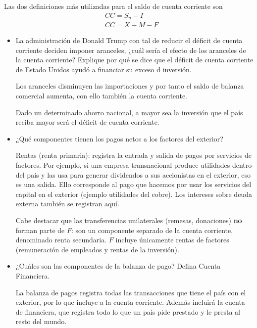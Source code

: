 \documentclass[a4paper]{article}
\begin{document}
        Las dos definiciones más utilizadas para el saldo de cuenta corriente son 
        \begin{align*}
            &CC = S_n -I \\
            &CC = X-M-F
        \end{align*}
        \begin{itemize}
        \item[f)] La administración de Donald Trump con tal de reducir el déficit de cuenta corriente deciden imponer aranceles, ¿cuál sería el efecto de los aranceles de la cuenta corriente? Explique por qué se dice que el déficit de cuenta corriente de Estado Unidos ayudó a financiar su exceso d inversión. 

        \begin{solution}
            Los aranceles disminuyen las importaciones y por tanto el saldo de balanza comercial aumenta, con ello también la cuenta corriente.

            Dado un determinado ahorro nacional, a mayor sea la inversión que el país reciba mayor será el déficit de cuenta corriente.
        \end{solution}

        \item[g)] ¿Qué componentes tienen los pagos netos a los factores del exterior? 
        \begin{solution}
            Rentas (renta primaria): registra la entrada y salida de pagos por servicios de factores. Por ejemplo, si una empresa transnacional produce utilidades dentro del país y las usa para generar dividendos a sus accionistas en el exterior, eso es una salida. Ello corresponde al pago que hacemos por usar los servicios del capital en el exterior (ejemplo utilidades del cobre). Los intereses sobre deuda externa también se registran aquí.

            Cabe destacar que las transferencias unilaterales (remesas, donaciones) \textbf{no} forman parte de $F$: son un componente separado de la cuenta corriente, denominado renta secundaria. $F$ incluye únicamente rentas de factores (remuneración de empleados y rentas de la inversión).

        \end{solution}

        \item[h)] ¿Cuáles son las componentes de la balanza de pago? Defina Cuenta Financiera.
        \begin{solution}
            La balanza de pagos registra todas las transacciones que tiene el país con el exterior, por lo que incluye a la cuenta corriente. Además incluirá la cuenta de financiera, que registra todo lo que un país pide prestado y le presta al resto del mundo.


\end{solution}
\end{itemize}
\end{document}
